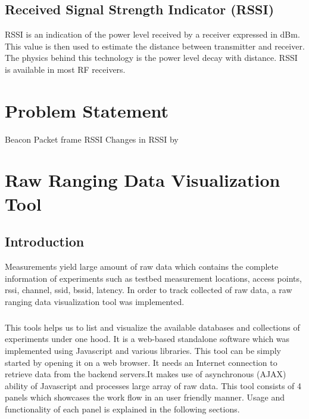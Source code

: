 \documentclass[11pt,a4paper,headinclude,footinclude,chapterprefix=on]{scrreprt}
\begin{document}
\section{Received Signal Strength Indicator (RSSI)} RSSI is an indication of the power level received by a receiver expressed in dBm. This value is then used to estimate the distance between
transmitter and receiver. The physics behind this technology
is the power level decay with distance. RSSI is available in
most RF receivers.

\chapter{Problem Statement}
Beacon Packet frame RSSI
Changes in RSSI by 	

\chapter{Raw Ranging Data Visualization Tool}
\section*{Introduction} 
Measurements yield large amount of raw data which contains the complete information of experiments such as testbed measurement locations, access points, rssi, channel, ssid, bssid, latency. In order to track collected of raw data, a raw ranging data visualization tool was implemented. 

\paragraph{}This tools helps us to list and visualize the available databases and collections of experiments under one hood. It is a web-based standalone software which was implemented using Javascript and various libraries. This tool can be simply started by opening it on a web browser. It needs an Internet connection to retrieve data from the backend servers.It makes use of asynchronous (AJAX) ability of Javascript and processes large array of raw data. This tool consists of 4 panels which showcases the work flow in an user friendly manner. Usage and functionality of each panel is explained in the following sections.
\end{document}
